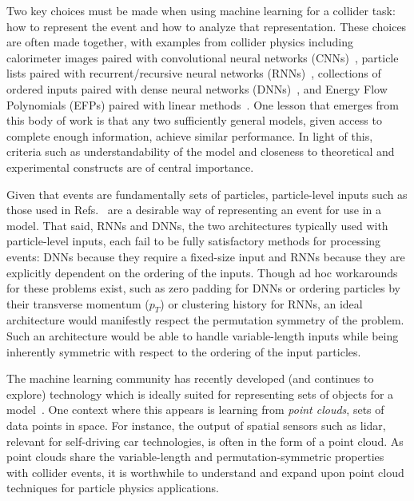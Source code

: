 \documentclass[letterpaper,11pt]{article}
\DeclareRobustCommand{\Refs}[1]{Refs.~\cite{#1}}
\begin{document}
Two key choices must be made when using machine learning for a collider task: how to represent the event and how to analyze that representation.
%
These choices are often made together, with examples from collider physics including calorimeter images paired with convolutional neural networks (CNNs)~\cite{deOliveira:2015xxd,Baldi:2016fql,Barnard:2016qma,Komiske:2016rsd,ATL-PHYS-PUB-2017-017,Kasieczka:2017nvn,Bhimji:2017qvb,Macaluso:2018tck,Guo:2018hbv,Dreyer:2018nbf}, particle lists paired with recurrent/recursive neural networks (RNNs)~\cite{Guest:2016iqz,Louppe:2017ipp,Cheng:2017rdo,Egan:2017ojy,Fraser:2018ieu}, collections of ordered inputs paired with dense neural networks (DNNs)~\cite{Almeida:2015jua,Pearkes:2017hku,Butter:2017cot,Roxlo:2018adx,Datta:2017rhs,Aguilar-Saavedra:2017rzt,Luo:2017ncs,Moore:2018lsr}, and Energy Flow Polynomials (EFPs) paired with linear methods~\cite{Komiske:2017aww}.
%
One lesson that emerges from this body of work is that any two sufficiently general models, given access to complete enough information, achieve similar performance.
%
In light of this, criteria such as understandability of the model and closeness to theoretical and experimental constructs are of central importance.


Given that events are fundamentally sets of particles, particle-level inputs such as those used in \Refs{Guest:2016iqz,Louppe:2017ipp,Cheng:2017rdo,Egan:2017ojy,Fraser:2018ieu,Almeida:2015jua,Pearkes:2017hku,Butter:2017cot} are a desirable way of representing an event for use in a model.
%
That said, RNNs and DNNs, the two architectures typically used with particle-level inputs, each fail to be fully satisfactory methods for processing events:  DNNs because they require a fixed-size input and RNNs because they are explicitly dependent on the ordering of the inputs.
%
Though ad hoc workarounds for these problems exist, such as zero padding for DNNs or ordering particles by their transverse momentum ($p_T$) or clustering history for RNNs, an ideal architecture would manifestly respect the permutation symmetry of the problem.
%
Such an architecture would be able to handle variable-length inputs while being inherently symmetric with respect to the ordering of the input particles.


The machine learning community has recently developed (and continues to explore) technology which is ideally suited for representing sets of objects for a model~\cite{DBLP:conf/acl/IyyerMBD15,DBLP:conf/cvpr/QiSMG17,DBLP:conf/iccv/RezatofighiGMAD17,DBLP:conf/nips/QiYSG17,DBLP:conf/nips/ZaheerKRPSS17,DBLP:journals/corr/abs-1709-03019,DBLP:journals/corr/abs-1712-07262,DBLP:conf/aaai/RezatofighiMSD018,DBLP:journals/corr/abs-1805-00613,DBLP:journals/corr/abs-1806-00050}.
%
One context where this appears is learning from \emph{point clouds}, sets of data points in space.
%
For instance, the output of spatial sensors such as lidar, relevant for self-driving car technologies, is often in the form of a point cloud.
%
As point clouds share the variable-length and permutation-symmetric properties with collider events, it is worthwhile to understand and expand upon point cloud techniques for particle physics applications.
\end{document}
